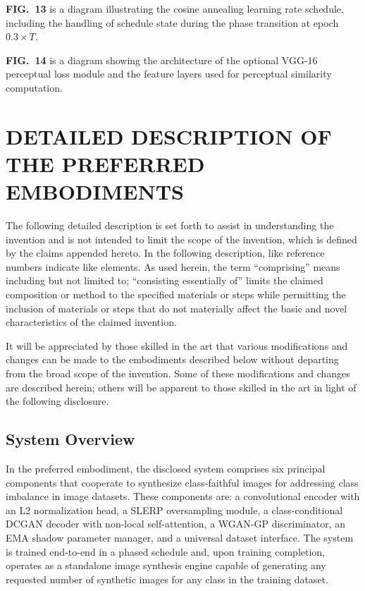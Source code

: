 \documentclass[12pt,letterpaper]{article}
\begin{document}
\textbf{FIG.\ 13} is a diagram illustrating the cosine annealing learning rate
schedule, including the handling of schedule state during the phase transition
at epoch $0.3 \times T$.

\textbf{FIG.\ 14} is a diagram showing the architecture of the optional VGG-16
perceptual loss module and the feature layers used for perceptual similarity
computation.

\section*{DETAILED DESCRIPTION OF THE PREFERRED EMBODIMENTS}

The following detailed description is set forth to assist in understanding the
invention and is not intended to limit the scope of the invention, which is
defined by the claims appended hereto. In the following description, like
reference numbers indicate like elements. As used herein, the term
``comprising'' means including but not limited to; ``consisting essentially of''
limits the claimed composition or method to the specified materials or steps
while permitting the inclusion of materials or steps that do not materially
affect the basic and novel characteristics of the claimed invention.

It will be appreciated by those skilled in the art that various modifications
and changes can be made to the embodiments described below without departing
from the broad scope of the invention. Some of these modifications and changes
are described herein; others will be apparent to those skilled in the art in
light of the following disclosure.

\subsection{System Overview}

In the preferred embodiment, the disclosed system comprises six principal
components that cooperate to synthesize class-faithful images for addressing
class imbalance in image datasets. These components are: a convolutional encoder
with an L2 normalization head, a SLERP oversampling module, a class-conditional
DCGAN decoder with non-local self-attention, a WGAN-GP discriminator, an EMA
shadow parameter manager, and a universal dataset interface. The system is
trained end-to-end in a phased schedule and, upon training completion, operates
as a standalone image synthesis engine capable of generating any requested
number of synthetic images for any class in the training dataset.
\end{document}
